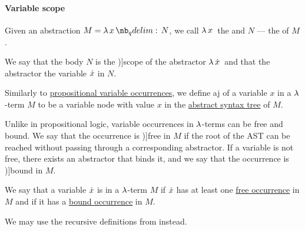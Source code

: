 \paragraph{Variable scope}

\begin{definition}\label{def:lambda_abstractor}
  Given an abstraction \( M = \qabs x N \), we call \( \qabs* x \) the  and \( N \) --- the  of \( M \).

  We say that the body \( N \) is the \term[ru=область действия (\cite[64]{Герасимов2011})]{scope} of the abstractor \( \quantifier* \synlambda \synx \) and that the abstractor  the variable \( {\dot{x}} \) in \( N \).
\end{definition}

\begin{definition}\label{def:lambda_variable_occurrence}\mimprovised
  Similarly to \hyperref[def:propositional_variable_occurrence]{propositional variable occurrences}, we define aj  of a variable \( x \) in a \( \mathrm{\lambda} \)-term \( M \) to be a variable node with value \( x \) in the \hyperref[def:lambda_term_ast]{abstract syntax tree} of \( M \).

  Unlike in propositional logic, variable occurrences in \( \mathrm{\lambda} \)-terms can be free and bound. We say that the occurrence is \term[ru=свободное (вхождение) (\cite[64]{Герасимов2011})]{free} in \( M \) if the root of the AST can be reached without passing through a corresponding abstractor. If a variable is not free, there exists an abstractor that binds it, and we say that the occurrence is \term[ru=связанное (вхождение) (\cite[64]{Герасимов2011})]{bound} in \( M \).
\end{definition}

\begin{definition}\label{def:lambda_variable_freeness}\mimprovised
  We say that a variable \( {\dot{x}} \) is  in a \( \mathrm{\lambda} \)-term \( M \) if \( {\dot{x}} \) has at least one \hyperref[def:lambda_variable_occurrence]{free occurrence} in \( M \) and  if it has a \hyperref[def:lambda_variable_occurrence]{bound occurrence} in \( M \).
\end{definition}
\begin{comments}
  \item We may use the recursive definitions from  instead.
\end{comments}

